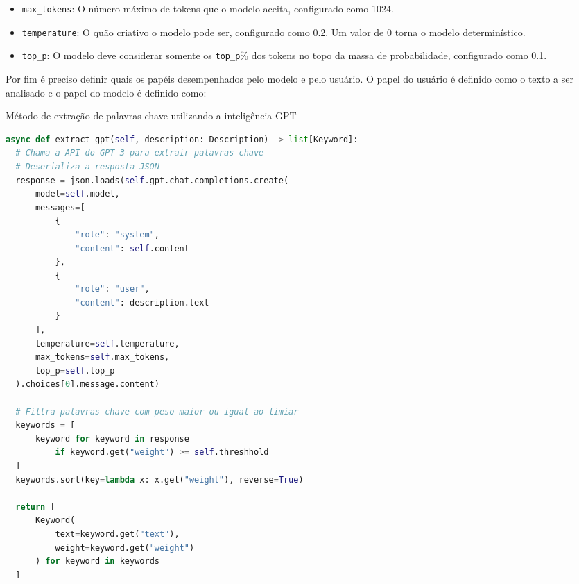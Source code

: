 \begin{itemize}
  \item \texttt{max\_tokens}: O número máximo de tokens que o modelo aceita, configurado como 1024.
  \item \texttt{temperature}: O quão criativo o modelo pode ser, configurado como 0.2. Um valor de 0 torna o modelo determinístico.
  \item \texttt{top\_p}: O modelo deve considerar somente os \texttt{top\_p}\% dos tokens no topo da massa de probabilidade, configurado como 0.1.
\end{itemize}

Por fim é preciso definir quais os papéis desempenhados pelo modelo e pelo usuário. O papel do usuário é definido como o texto a ser analisado e o papel do modelo é definido como:


\begin{sourcecode}[htb]
  \caption{\label{codigo:extract-gpt}Método de extração de palavras-chave utilizando a inteligência GPT}
  \begin{lstlisting}[frame=single, language=Python]
async def extract_gpt(self, description: Description) -> list[Keyword]:
  # Chama a API do GPT-3 para extrair palavras-chave
  # Deserializa a resposta JSON
  response = json.loads(self.gpt.chat.completions.create(
      model=self.model,
      messages=[
          {
              "role": "system",
              "content": self.content
          },
          {
              "role": "user",
              "content": description.text
          }
      ],
      temperature=self.temperature,
      max_tokens=self.max_tokens,
      top_p=self.top_p
  ).choices[0].message.content)

  # Filtra palavras-chave com peso maior ou igual ao limiar
  keywords = [
      keyword for keyword in response 
          if keyword.get("weight") >= self.threshhold
  ]
  keywords.sort(key=lambda x: x.get("weight"), reverse=True)

  return [
      Keyword(
          text=keyword.get("text"), 
          weight=keyword.get("weight")
      ) for keyword in keywords
  ]
\end{lstlisting}
  \fonte{}
\end{sourcecode}

